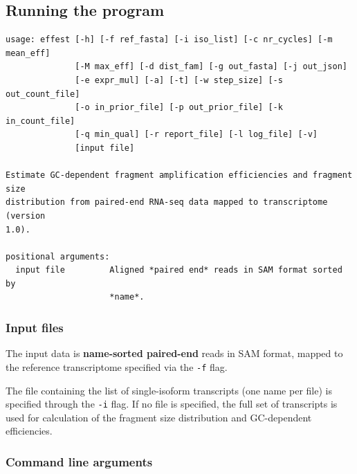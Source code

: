 \subsection{Running the program}

\begin{verbatim}
usage: effest [-h] [-f ref_fasta] [-i iso_list] [-c nr_cycles] [-m mean_eff]
              [-M max_eff] [-d dist_fam] [-g out_fasta] [-j out_json]
              [-e expr_mul] [-a] [-t] [-w step_size] [-s out_count_file]
              [-o in_prior_file] [-p out_prior_file] [-k in_count_file]
              [-q min_qual] [-r report_file] [-l log_file] [-v]
              [input file]

Estimate GC-dependent fragment amplification efficiencies and fragment size
distribution from paired-end RNA-seq data mapped to transcriptome (version
1.0).

positional arguments:
  input file         Aligned *paired end* reads in SAM format sorted by
                     *name*.
\end{verbatim}

\subsubsection{Input files}

The input data is \textbf{name-sorted paired-end} reads in SAM format, mapped to the reference transcriptome
specified via the \texttt{-f} flag.

The file containing the list of single-isoform transcripts (one name per file) is specified through the \texttt{-i} flag. If no file is specified, the full set of transcripts is used for calculation of the fragment size distribution and GC-dependent efficiencies.


\subsubsection{Command line arguments}

